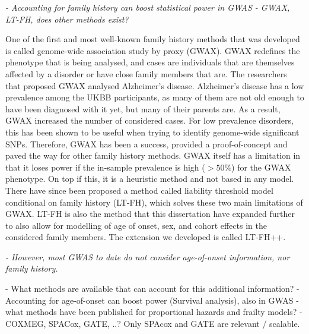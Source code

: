 {\itshape
	- Accounting for family history can boost statistical power in GWAS
	- GWAX, LT-FH, does other methods exist?
}

One of the first and most well-known family history methods that was developed is called genome-wide association study by proxy 
(GWAX). GWAX redefines the phenotype that is being analysed, and cases are individuals that are themselves affected 
by a disorder or have close family members that are. The researchers that proposed GWAX analysed Alzheimer's disease. Alzheimer's 
disease has a low prevalence among the UKBB participants, as many of them are not old enough to have been diagnosed with it yet, but 
many of their parents are. As a result, GWAX increased the number of considered cases. For low prevalence disorders, this 
has been shown to be useful when trying to identify genome-wide significant SNPs. Therefore, GWAX has been a success, provided a 
proof-of-concept and paved the way for other family history methods. GWAX itself has a limitation in that it loses power if the 
in-sample prevalence is high ($ >50\% $) for the GWAX phenotype. On top if this, it is a heuristic method and not based in any model. 
There have since been proposed a method called liability threshold model conditional on family history (LT-FH), which solves these two 
main limitations of GWAX. LT-FH is also the method that this dissertation have expanded further to also allow for modelling of age of 
onset, sex, and cohort effects in the considered family members. The extension we developed is called LT-FH++.



{\itshape
- However, most GWAS to date do not consider age-of-onset information, nor family history.

	- What methods are available that can account for this additional information?
	- Accounting for age-of-onset can boost power (Survival analysis), also in GWAS 
	- what methods have been published for proportional hazards and frailty models?
	- COXMEG, SPACox, GATE, ..? Only SPAcox and GATE are relevant / scalable.
}

